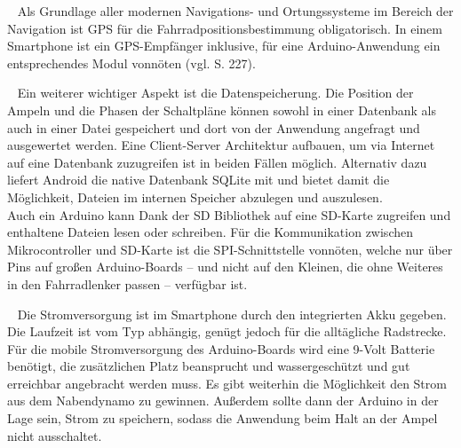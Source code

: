 \begin{description}[leftmargin=0.7cm,style=nextline]
  \item[\gls{GPS}] ~ Als Grundlage aller modernen Navigations- und Ortungssysteme im Bereich der Navigation ist \gls{GPS} für die Fahrradpositionsbestimmung obligatorisch. In einem \gls{Smartphone} ist ein \gls{GPS}-Empfänger inklusive, für eine \gls{Arduino}-Anwendung ein entsprechendes Modul vonnöten (vgl. \cite{arduino} S. 227).\\
 \item[Datenspeicherung] ~ Ein weiterer wichtiger Aspekt ist die Datenspeicherung. Die Position der Ampeln und die Phasen der Schaltpläne können sowohl in einer Datenbank als auch in einer Datei gespeichert und dort von der Anwendung angefragt und ausgewertet werden. Eine Client-Server Architektur aufbauen, um via Internet auf eine Datenbank zuzugreifen ist in beiden Fällen möglich. Alternativ dazu liefert Android die native Datenbank SQLite mit und bietet damit die Möglichkeit, Dateien im internen Speicher abzulegen und auszulesen.\\ 
Auch ein \gls{Arduino} kann Dank der SD Bibliothek auf eine SD-Karte zugreifen und enthaltene Dateien lesen oder schreiben. Für die Kommunikation zwischen Mikrocontroller und SD-Karte ist die SPI-Schnittstelle vonnöten, welche nur über Pins auf großen \gls{Arduino}-Boards -- und nicht auf den Kleinen, die ohne Weiteres in den Fahrradlenker passen -- verfügbar ist.\cite{arduino_sd}\\
  \item[Stromversorgung] ~ Die Stromversorgung ist im \gls{Smartphone} durch den integrierten Akku gegeben. Die Laufzeit ist vom Typ abhängig, genügt jedoch für die alltägliche Radstrecke. Für die mobile Stromversorgung des \gls{Arduino}-Boards wird eine 9-Volt Batterie benötigt, die zusätzlichen Platz beansprucht und wassergeschützt und gut erreichbar angebracht werden muss. Es gibt weiterhin die Möglichkeit den Strom aus dem Nabendynamo zu gewinnen. Außerdem sollte dann der \gls{Arduino} in der Lage sein, Strom zu speichern, sodass die Anwendung beim Halt an der Ampel nicht ausschaltet.\\

\end{description}
